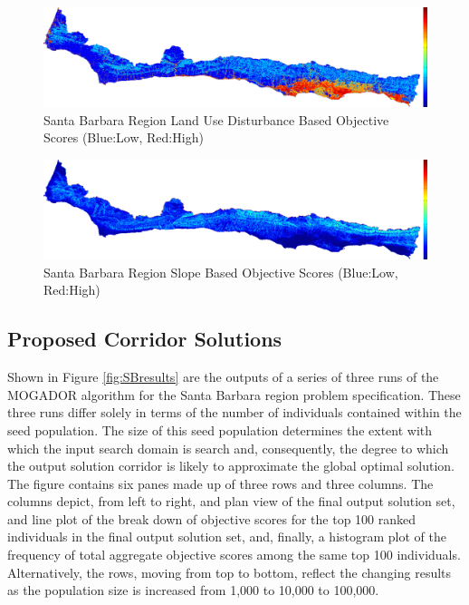         \begin{figure}[!h]
            \begin{center}
            \includegraphics[width=5.5in]{figures/SantaBarbara_DisturbanceScore.png}   
            \caption{Santa Barbara Region Land Use Disturbance Based Objective Scores (Blue:Low, Red:High)}
            \label{fig:SBdisturbance}
            \end{center}
        \end{figure}
        
        \begin{figure}[!h]
            \begin{center}
            \includegraphics[width=5.5in]{figures/SantaBarbara_SlopeScore.png}   
            \caption{Santa Barbara Region Slope Based Objective Scores (Blue:Low, Red:High)}
            \label{fig:SBslope}
            \end{center}
        \end{figure}
        
    \subsection{Proposed Corridor Solutions}
    
Shown in Figure \ref{fig:SBresults} are the outputs of a series of three runs of the MOGADOR algorithm for the Santa Barbara region problem specification. These three runs differ solely in terms of the number of individuals contained within the seed population. The size of this seed population determines the extent with which the input search domain is search and, consequently, the degree to which the output solution corridor is likely to approximate the global optimal solution. The figure contains six panes made up of three rows and three columns. The columns depict, from left to right, and plan view of the final output solution set, and line plot of the break down of objective scores for the top 100 ranked individuals in the final output solution set, and, finally, a histogram plot of the frequency of total aggregate objective scores among the same top 100 individuals. Alternatively, the rows, moving from top to bottom, reflect the changing results as the population size is increased from 1,000 to 10,000 to 100,000. 

